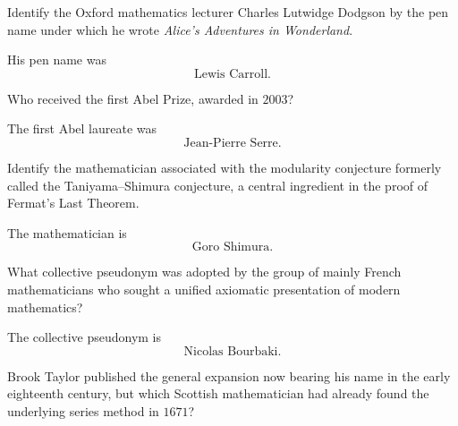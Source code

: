     \begin{expectedproblem}
        Identify the Oxford mathematics lecturer Charles Lutwidge Dodgson by the
        pen name under which he wrote
        \textit{Alice's Adventures in Wonderland}.
    \end{expectedproblem}

    \begin{solution}
        His pen name was
        \[
            \boxed{\text{Lewis Carroll}}.
        \]
    \end{solution}

    \begin{expectedproblem}
        Who received the first Abel Prize, awarded in $2003$?
    \end{expectedproblem}

    \begin{solution}
        The first Abel laureate was
        \[
            \boxed{\text{Jean-Pierre Serre}}.
        \]
    \end{solution}

    \begin{expectedproblem}
        Identify the mathematician associated with the modularity conjecture
        formerly called the Taniyama--Shimura conjecture, a central ingredient
        in the proof of Fermat's Last Theorem.
    \end{expectedproblem}

    \begin{solution}
        The mathematician is
        \[
            \boxed{\text{Goro Shimura}}.
        \]
    \end{solution}

    \begin{expectedproblem}
        What collective pseudonym was adopted by the group of mainly French
        mathematicians who sought a unified axiomatic presentation of modern
        mathematics?
    \end{expectedproblem}

    \begin{solution}
        The collective pseudonym is
        \[
            \boxed{\text{Nicolas Bourbaki}}.
        \]
    \end{solution}

    \begin{expectedproblem}
        Brook Taylor published the general expansion now bearing his name in
        the early eighteenth century, but which Scottish mathematician had
        already found the underlying series method in $1671$?
    \end{expectedproblem}

